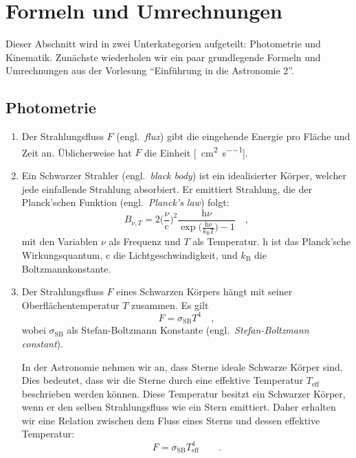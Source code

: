 \clearpage
\section{Formeln und Umrechnungen}
\label{sec:formeln_und_umrechnungen}

Dieser Abschnitt wird in zwei Unterkategorien aufgeteilt: Photometrie und Kinematik.
Zunächste wiederholen wir ein paar grundlegende Formeln und Umrechnungen aus der Vorlesung ``Einführung in die Astronomie 2''.


\subsection{Photometrie}
\label{subsec:photometrie}

\begin{enumerate}[label=$\smalltriangleright$]
  \item
  Der Strahlungsfluss $F$ (engl.\ \textit{flux}) gibt die eingehende Energie pro Fläche und Zeit an.
  Üblicherweise hat $F$ die Einheit [\si{\erg\per\centi\metre\squared\per\second}].

  \item
  Ein Schwarzer Strahler (engl.\ \textit{black body}) ist ein idealisierter Körper, welcher jede einfallende Strahlung absorbiert.
  Er emittiert Strahlung, die der Planck'schen Funktion (engl.\ \textit{Planck's law}) folgt:
  \begin{equation}
    B_{\nu, T} = 2 \Big( \frac{\nu}{\mathrm{c}} \Big)^{2} \frac{\mathrm{h}\nu}{\exp \big( \frac{\mathrm{h}\nu}{k_{\mathrm{B}} T} \big) - 1} \quad,
  \end{equation}
  mit den Variablen $\nu$ als Frequenz und $T$ als Temperatur.
  $\mathrm{h}$ ist das Planck'sche Wirkungsquantum, $\mathrm{c}$ die Lichtgeschwindigkeit, und $k_{\mathrm{B}}$ die Boltzmannkonstante.

  \item
  Der Strahlungsfluss $F$ eines Schwarzen Körpers hängt mit seiner Oberflächentemperatur $T$ zusammen.
  Es gilt
  \begin{equation*}
    F = \sigma_{\mathrm{SB}} T^{4} \quad ,
  \end{equation*}
  wobei $\sigma_{\mathrm{SB}}$ als Stefan-Boltzmann Konstante (engl.\ \textit{Stefan-Boltzmann constant}).

  In der Astronomie nehmen wir an, dass Sterne ideale Schwarze Körper sind.
  Dies bedeutet, dass wir die Sterne durch eine effektive Temperatur $T_{\mathrm{eff}}$ beschrieben werden können.
  Diese Temperatur besitzt ein Schwarzer Körper, wenn er den selben Strahlungsfluss wie ein Stern emittiert.
  Daher erhalten wir eine Relation zwischen dem Fluss eines Sterns und dessen effektive Temperatur:
  \begin{equation}
    F = \sigma_{\mathrm{SB}} T_{\mathrm{eff}}^{4} \quad  \quad .
  \end{equation}


\end{enumerate}
